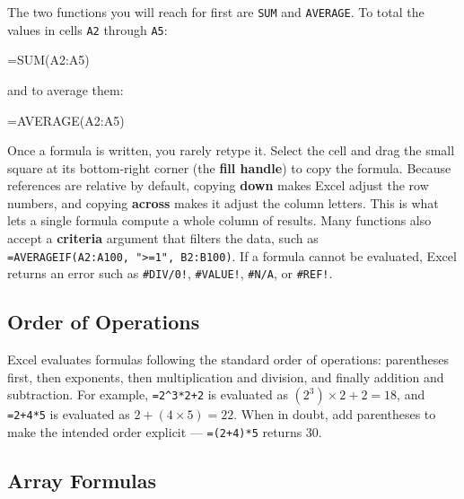 \documentclass[
  11pt,
  letterpaper,
  DIV=11,
  numbers=noendperiod,
  oneside,
  open=any]{scrreprt}
\newenvironment{Shaded}{\begin{snugshade}}{\end{snugshade}}
\newcommand{\NormalTok}[1]{\textcolor[rgb]{0.00,0.23,0.31}{#1}}
\begin{document}
The two functions you will reach for first are \texttt{SUM} and
\texttt{AVERAGE}. To total the values in cells \texttt{A2} through
\texttt{A5}:

\begin{Shaded}
\begin{Highlighting}[]
\NormalTok{=SUM(A2:A5)}
\end{Highlighting}
\end{Shaded}

and to average them:

\begin{Shaded}
\begin{Highlighting}[]
\NormalTok{=AVERAGE(A2:A5)}
\end{Highlighting}
\end{Shaded}

Once a formula is written, you rarely retype it. Select the cell and
drag the small square at its bottom-right corner (the \textbf{fill
handle}) to copy the formula. Because references are relative by
default, copying \textbf{down} makes Excel adjust the row numbers, and
copying \textbf{across} makes it adjust the column letters. This is what
lets a single formula compute a whole column of results. Many functions
also accept a \textbf{criteria} argument that filters the data, such as
\texttt{=AVERAGEIF(A2:A100,\ "\textgreater{}=1",\ B2:B100)}. If a
formula cannot be evaluated, Excel returns an error such as
\texttt{\#DIV/0!}, \texttt{\#VALUE!}, \texttt{\#N/A}, or
\texttt{\#REF!}.

\subsection*{Order of Operations}\label{order-of-operations}

Excel evaluates formulas following the standard order of operations:
parentheses first, then exponents, then multiplication and division, and
finally addition and subtraction. For example, \texttt{=2\^{}3*2+2} is
evaluated as \((2^3) \times 2 + 2 = 18\), and \texttt{=2+4*5} is
evaluated as \(2 + (4 \times 5) = 22\). When in doubt, add parentheses
to make the intended order explicit --- \texttt{=(2+4)*5} returns
\(30\).

\subsection*{Array Formulas}\label{array-formulas}
\end{document}
